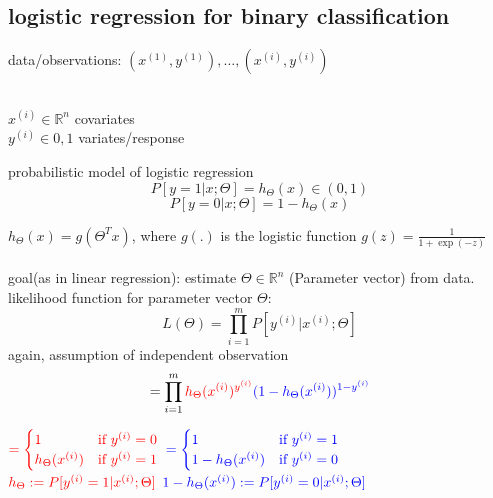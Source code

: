\documentclass[a4paper, 12pt]{scrartcl}
\begin{document}
\subsection*{logistic regression for binary classification}
data/observations: $(x^{(1)}, y^{(1)}), \dots , (x^{(i)}, y^{(i)})$\\\\
\begin{center}
 $x^{(i)} \in \mathbb{R}^n$ \space covariates\\
 $y^{(i)} \in {0,1}$ \space variates/response
\end{center}
probabilistic model of logistic regression
\[P[y=1|x;\Theta] = h_{\Theta}(x) \in (0,1)\]
\[P[y=0|x;\Theta] = 1-h_{\Theta}(x) \]

$h_{\Theta}(x) = g(\Theta^T x)$, where $g(.)$ is the logistic function $g(z) = \frac{1}{1+\exp(-z)}$\\\\
goal(as in linear regression): estimate $\Theta \in \mathbb{R}^n$ (Parameter vector) from data.\\
likelihood function for parameter vector $\Theta$:
\[L(\Theta) = \prod^m_{i=1} P[y^{(i)}|x^{(i)} ; \Theta]\]
again, assumption of independent observation
\[= \prod^m_{i=1} \textcolor{red}{h_{\Theta}(x^{(i)})^{y^{(i)}}} \textcolor{blue}{(1-h_{\Theta}(x^{(i)}))^{1-y^{(i)}}}\]
\begin{center}

$\textcolor{red}{=\begin{cases}1&\text{if $y^{(i)} = 0$}\\h_{\Theta}(x^{(i)})&\text{if $y^{(i)} = 1$}\end{cases}}$
$\textcolor{blue}{=\begin{cases}1&\text{if $y^{(i)} = 1$}\\1-h_{\Theta}(x^{(i)})&\text{if $y^{(i)} = 0$}\end{cases}}$\\
$\textcolor{red}{h_{\Theta} := P[y^{(i)} = 1 | x^{(i)};\Theta]}$\space\space
$\textcolor{blue}{1-h_{\Theta}(x^{(i)}) := P[y^{(i)} = 0 | x^{(i)};\Theta]}$
\end{center}
\end{document}

